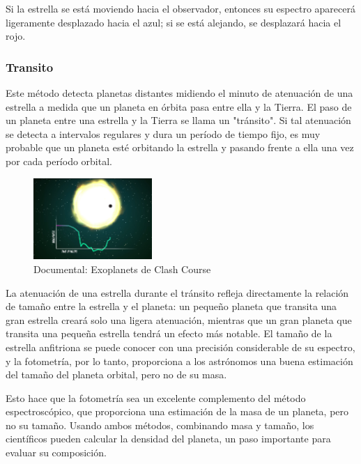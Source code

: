 \documentclass[fleqn, journal]{IEEEtran}                        %
\theoremstyle{break}                                            %
\begin{document}
                Si la estrella se está moviendo hacia el observador, entonces su espectro aparecerá ligeramente desplazado hacia
                el azul; si se está alejando, se desplazará hacia el rojo.
                \cite{wea6}
                
                
            \vspace{1em}
            \subsubsection{Transito}

                Este método detecta planetas distantes midiendo el minuto de atenuación de una estrella a medida que un
                planeta en órbita pasa entre ella y la Tierra. El paso de un planeta entre una estrella y la Tierra se
                llama un "tránsito". Si tal atenuación se detecta a intervalos regulares y dura un período de tiempo fijo,
                es muy probable que un planeta esté orbitando la estrella y pasando frente a ella una vez por cada período orbital.


                \begin{figure}[h]
                    \includegraphics[width=0.40\textwidth]{Transit}
                    \caption{Documental: Exoplanets de Clash Course}
                \end{figure}

                La atenuación de una estrella durante el tránsito refleja directamente la relación de tamaño entre la estrella
                y el planeta: un pequeño planeta que transita una gran estrella creará solo una ligera atenuación, mientras
                que un gran planeta que transita una pequeña estrella tendrá un efecto más notable. El tamaño de la estrella
                anfitriona se puede conocer con una precisión considerable de su espectro, y la fotometría, por lo tanto,
                proporciona a los astrónomos una buena estimación del tamaño del planeta orbital, pero no de su masa.
                
                Esto hace que la fotometría sea un excelente complemento del método espectroscópico, que proporciona una estimación
                de la masa de un planeta, pero no su tamaño. Usando ambos métodos, combinando masa y tamaño, los científicos pueden
                calcular la densidad del planeta, un paso importante para evaluar su composición.
            
\end{document}
